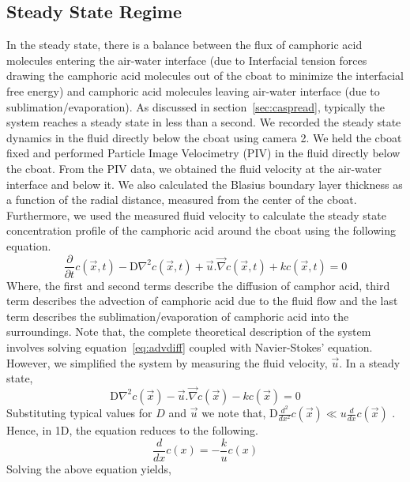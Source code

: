 \documentclass[aps,twocolumn, floatfix, superscriptaddress]{revtex4}
\begin{document}
\subsection{Steady State Regime}
\label{sec:steady}
In the steady state, there is a balance between the flux of camphoric acid molecules entering the air-water interface (due to Interfacial tension forces drawing the camphoric acid molecules out of the cboat to minimize the interfacial free energy) and camphoric acid molecules leaving air-water interface (due to sublimation/evaporation). As discussed in section~\ref{sec:caspread}, typically the system reaches a steady state in less than a second. We recorded the steady state dynamics in the fluid directly below the cboat using camera 2. We held the cboat fixed and performed Particle Image Velocimetry (PIV) in the fluid directly below the cboat. From the PIV data, we obtained the fluid velocity at the air-water interface and below it. We also calculated the Blasius boundary layer thickness as a function of the radial distance, measured from the center of the cboat. Furthermore, we used the measured fluid velocity to calculate the steady state concentration profile of the camphoric acid around the cboat using the following equation. 
\begin{equation} \label{eq:advdiff}
\frac{\partial}{\partial t} c(\vec{x}, t) - \mathrm{D} \nabla^2 c(\vec{x}, t) + \vec{u}.\vec{\nabla} c(\vec{x}, t) + k c(\vec{x}, t) = 0 
\end{equation}
Where, the first and second terms describe the diffusion of camphor acid, third term describes the advection of camphoric acid due to the fluid flow and the last term describes the sublimation/evaporation of camphoric acid into the surroundings. Note that, the complete theoretical description of the system involves solving equation~\ref{eq:advdiff} coupled with Navier-Stokes’ equation. However, we simplified the system by measuring the fluid velocity, $\vec{u}$. In a steady state,
\begin{equation} \label{eq:steady}
\mathrm{D} \nabla^2 c(\vec{x}) - \vec{u}.\vec{\nabla} c(\vec{x}) - k c(\vec{x}) = 0 
\end{equation}
Substituting typical values for $D$ and $\vec{u}$ we note that, $\mathrm{D} \frac{d^2}{d x^2} c(\vec{x}) \ll u \frac{d}{dx}c(\vec{x})$ . Hence, in 1D, the equation reduces to the following.
\begin{equation} 
\frac{d}{dx}c(x) = -\frac{k}{u}c(x)
\end{equation}
Solving the above equation yields, 
\end{document}

